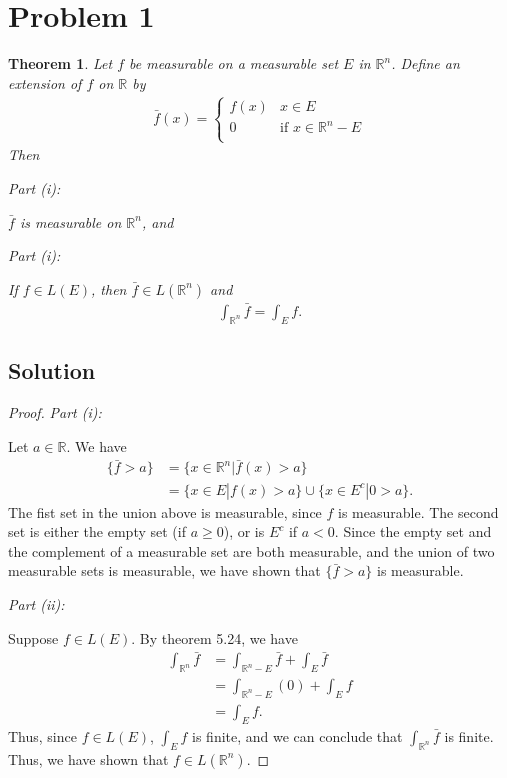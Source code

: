 \documentclass[10pt,a4paper]{article}
\author{Jeremiah Givens}
\makeatletter
\theoremstyle{theorem}
\newtheorem{theorem}{Theorem}
\newcommand{\proofpart}[2]{%
  \par
  \addvspace{\medskipamount}%
  \noindent\emph{Part #1: #2}\par\nobreak
  \addvspace{\smallskipamount}%
  \@afterheading
}
\theoremstyle{definition}
\makeatother
\begin{document}
\section*{Problem 1}
\begin{theorem}
Let $f$ be measurable on a measurable set $E$ in $\mathbb{R}^n$. Define an extension of $f$ on $\mathbb{R}$ by 
\begin{align*}
\bar{f}(x) = \begin{cases} 
      f(x) & x \in E \\
     0 & \text{if } x\in \mathbb{R}^n - E \\
\end{cases}
\end{align*}
Then
\proofpart{(i)}{} $\bar{f}$ is measurable on $\mathbb{R}^n$, and

\proofpart{(i)}{} If $f \in L(E)$, then $\bar{f} \in L(\mathbb{R}^n)$ and
\begin{align*}
\int_{\mathbb{R}^n} \bar{f} = \int_E f.
\end{align*}
\end{theorem}

\subsection*{Solution}
\begin{proof}
\proofpart{(i)}{} Let $a \in \mathbb{R}$.  We have
\begin{align*}
\{\bar{f} > a \} &= \{x \in \mathbb{R}^n| \bar{f}(x) > a \}\\
&= \{x \in E| f(x) > a \} \cup \{x \in E^c| 0 > a \}.
\end{align*}
The fist set in the union above is measurable, since $f$ is measurable. The second set is either the empty set (if $a \geq 0$), or is $E^c$ if $a < 0$.  Since the empty set and the complement of a measurable set are both measurable, and the union of two measurable sets is measurable, we have shown that $\{\bar{f} > a \}$ is measurable.

\proofpart{(ii)}{} Suppose $f \in L(E)$.  By theorem 5.24, we have
\begin{align*}
\int_{\mathbb{R}^n} \bar{f} &= \int_{\mathbb{R}^n - E} \bar{f} + \int_E \bar{f}\\
&= \int_{\mathbb{R}^n - E} (0) + \int_E f\\
&=  \int_E f.
\end{align*}
Thus, since $f \in L(E)$, $ \int_E f$ is finite, and we can conclude that $\int_{\mathbb{R}^n} \bar{f}$ is finite. Thus, we have shown that $f \in L(\mathbb{R}^n)$.
\end{proof}
\end{document}
